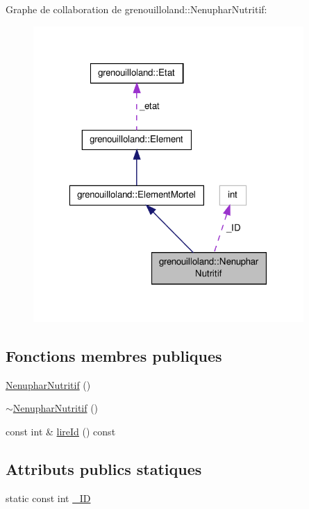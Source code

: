 Graphe de collaboration de grenouilloland\-:\-:Nenuphar\-Nutritif\-:
\nopagebreak
\begin{figure}[H]
\begin{center}
\leavevmode
\includegraphics[width=292pt]{classgrenouilloland_1_1NenupharNutritif__coll__graph}
\end{center}
\end{figure}
\subsection*{Fonctions membres publiques}
\begin{DoxyCompactItemize}
\item 
\hyperlink{classgrenouilloland_1_1NenupharNutritif_aedd08b77d494dab677136bd8fef1fb98}{Nenuphar\-Nutritif} ()
\item 
\hyperlink{classgrenouilloland_1_1NenupharNutritif_a6a2cbb69872e858c9786dfeac0351f10}{$\sim$\-Nenuphar\-Nutritif} ()
\item 
const int \& \hyperlink{classgrenouilloland_1_1NenupharNutritif_ac27d0cfbf8e2f4ee647031983a5fc1f4}{lire\-Id} () const 
\end{DoxyCompactItemize}
\subsection*{Attributs publics statiques}
\begin{DoxyCompactItemize}
\item 
static const int \hyperlink{classgrenouilloland_1_1NenupharNutritif_acfbcd62da4052d83f2b11e1a6baabe8d}{\-\_\-\-I\-D}
\end{DoxyCompactItemize}
